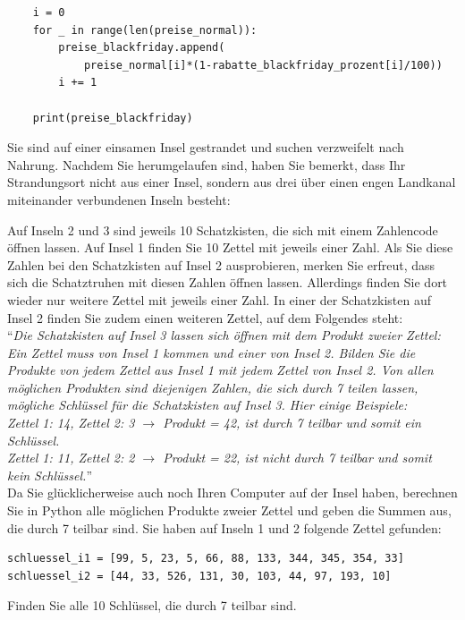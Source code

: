 \begin{questions}
\begin{solution}
\begin{lstlisting}
    i = 0
    for _ in range(len(preise_normal)):
        preise_blackfriday.append(
            preise_normal[i]*(1-rabatte_blackfriday_prozent[i]/100))
        i += 1

    print(preise_blackfriday)
    \end{lstlisting}
	\end{solution}

\clearpage
{}

Sie sind auf einer einsamen Insel gestrandet und suchen verzweifelt nach Nahrung. Nachdem Sie herumgelaufen sind, haben Sie bemerkt, dass Ihr Strandungsort nicht aus einer Insel, sondern aus drei über einen engen Landkanal miteinander verbundenen Inseln besteht:
\begin{figure}[H]
	\centering
\end{figure}
Auf Inseln 2 und 3 sind jeweils 10 Schatzkisten, die sich mit einem Zahlencode öffnen lassen. Auf Insel 1 finden Sie 10 Zettel mit jeweils einer Zahl. Als Sie diese Zahlen bei den Schatzkisten auf Insel 2 ausprobieren, merken Sie erfreut, dass sich die Schatztruhen mit diesen Zahlen öffnen lassen. Allerdings finden Sie dort wieder nur weitere Zettel mit jeweils einer Zahl. In einer der Schatzkisten auf Insel 2 finden Sie zudem einen weiteren Zettel, auf dem Folgendes steht:\\

``\textit{Die Schatzkisten auf Insel 3 lassen sich öffnen mit dem Produkt zweier Zettel: Ein Zettel muss von Insel 1 kommen und einer von Insel 2. Bilden Sie die Produkte von jedem Zettel aus Insel 1 mit jedem Zettel von Insel 2. Von allen möglichen Produkten sind diejenigen Zahlen, die sich durch 7 teilen lassen, mögliche Schlüssel für die Schatzkisten auf Insel 3. Hier einige Beispiele:\\
Zettel 1: 14, Zettel 2: 3 $\rightarrow$ Produkt = 42, ist durch 7 teilbar und somit ein Schlüssel.\\
Zettel 1: 11, Zettel 2: 2 $\rightarrow$ Produkt = 22, ist nicht durch 7 teilbar und somit kein Schlüssel.}''\\

Da Sie glücklicherweise auch noch Ihren Computer auf der Insel haben, berechnen Sie in Python alle möglichen Produkte zweier Zettel und geben die Summen aus, die durch 7 teilbar sind. Sie haben auf Inseln 1 und 2 folgende Zettel gefunden:
\begin{lstlisting}
schluessel_i1 = [99, 5, 23, 5, 66, 88, 133, 344, 345, 354, 33]
schluessel_i2 = [44, 33, 526, 131, 30, 103, 44, 97, 193, 10]
\end{lstlisting}
Finden Sie alle 10 Schlüssel, die durch 7 teilbar sind.


\end{questions}
